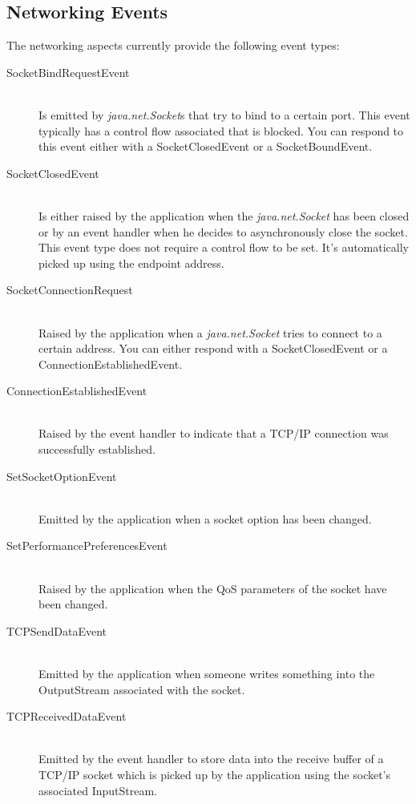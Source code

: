 \documentclass[a4paper,oneside]{book}
\begin{document}
\subsection{Networking Events}
The networking aspects currently provide the following event types:
\begin{description}
\item[SocketBindRequestEvent] \hfill \\
Is emitted by \textit{java.net.Socket}s that try to bind to a certain port. This event typically has a control flow associated that is blocked. You can respond to this event either with a SocketClosedEvent or a SocketBoundEvent.

\item[SocketClosedEvent] \hfill \\
Is either raised by the application when the \textit{java.net.Socket} has been closed or by an event handler when he decides to asynchronously close the socket. This event type does not require a control flow to be set. It's automatically picked up using the endpoint address.

\item[SocketConnectionRequest] \hfill \\
Raised by the application when a \textit{java.net.Socket} tries to connect to a certain address. You can either respond with a SocketClosedEvent or a ConnectionEstablishedEvent.

\item[ConnectionEstablishedEvent] \hfill \\
Raised by the event handler to indicate that a TCP/IP connection was successfully established.

\item[SetSocketOptionEvent] \hfill \\
Emitted by the application when a socket option has been changed.

\item[SetPerformancePreferencesEvent] \hfill \\
Raised by the application when the QoS parameters of the socket have been changed.

\item[TCPSendDataEvent] \hfill \\
Emitted by the application when someone writes something into the OutputStream associated with the socket.

\item[TCPReceivedDataEvent] \hfill \\
Emitted by the event handler to store data into the receive buffer of a TCP/IP socket which is picked up by the application using the socket's associated InputStream.


\end{description}
\end{document}
